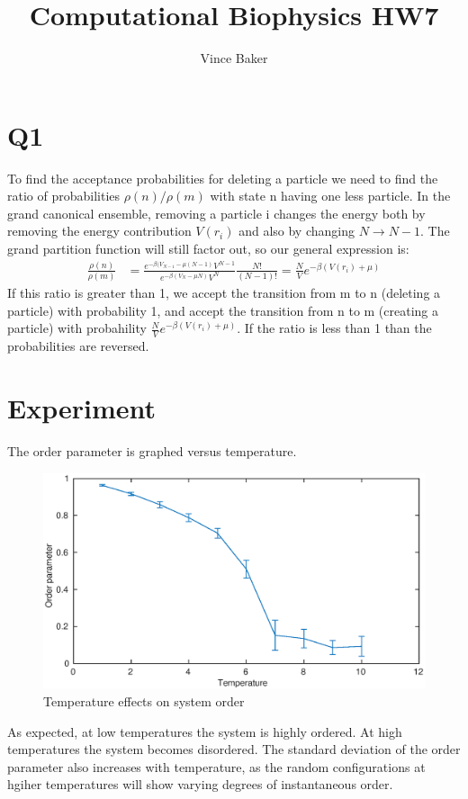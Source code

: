 \documentclass[a4paper,11pt]{article}
\title{Computational Biophysics HW7}
\author{Vince Baker}
\numberwithin{equation}{section}
\begin{document}
\maketitle

\section{Q1}
To find the acceptance probabilities for deleting a particle we need to find the ratio of probabilities $\rho(n)/\rho(m)$ with state n having one less particle.
In the grand canonical ensemble, removing a particle i changes the energy both by removing the energy contribution $V(r_i)$ and also by changing $N\rightarrow N-1$.
The grand partition function will still factor out, so our general expression is:
\begin{align}
 \frac{\rho(n)}{\rho(m)} &= \frac{e^{-\beta(V_{N-1}-\mu (N-1)}V^{N-1}}{e^{-\beta(V_{N}-\mu N)}V^{N}}\frac{N!}{(N-1)!} = \frac{N}{V}e^{-\beta(V(r_i)+\mu)}
\end{align}
If this ratio is greater than 1, we accept the transition from m to n (deleting a particle) with probability 1, and accept the transition from n to m (creating a particle) 
with probahility $\frac{N}{V}e^{-\beta(V(r_i)+\mu)}$. If the ratio is less than 1 than the probabilities are reversed.

\section{Experiment}
The order parameter is graphed versus temperature.
\begin{figure}[h]
 \caption{Temperature effects on system order}
 \centering
   \includegraphics[width=\textwidth]{OrderTemperature}
\end{figure}
As expected, at low temperatures the system is highly ordered. 
At high temperatures the system becomes disordered.
The standard deviation of the order parameter also increases with temperature, as the random configurations at hgiher temperatures will show varying degrees of instantaneous order.
\end{document}
